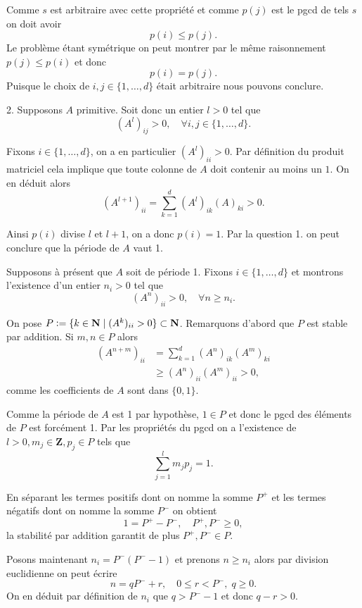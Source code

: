 \documentclass[12pt]{article}
\newcommand{\defeq}{\vcentcolon=}
\newcommand{\Z}{\mathbf{Z}}
\newcommand{\N}{\mathbf{N}}
\begin{document}
Comme $s$ est arbitraire avec cette propriété et comme $p(j)$ est le pgcd de tels $s$ on doit avoir  \[
        p(i) \le p(j)
.\] Le problème étant symétrique on peut montrer par le même raisonnement $p(j) \le p(i)$ et donc \[
p(i) = p(j)
.\] Puisque le choix de $i,j \in \{1,\ldots,d\}$ était arbitraire nous pouvons conclure. 

\bigskip

2. Supposons $A$ primitive. Soit donc un entier $l > 0$ tel que \[
        (A^{l})_{ij} > 0, \quad \forall i,j \in \{1,\ldots,d\} 
.\] 

Fixons $i \in \{1,\ldots,d\}$, on a en particulier $(A^{l})_{ii} > 0$. Par définition du produit matriciel cela implique que toute colonne de $A$ doit contenir au moins un $1$. On en déduit alors
\[
        (A^{l+1})_{ii} = \sum_{k=1}^{d} (A^{l})_{ik} (A)_{ki} > 0
.\] 

Ainsi $p(i)$ divise $l$ et $l+1$, on a donc $p(i) = 1$. Par la question 1. on peut conclure que la période de $A$ vaut 1.

\medskip

Supposons à présent que $A$ soit de période 1. Fixons $i \in \{1,\ldots,d\}$ et montrons l'existence d'un entier $n_{i} > 0$ tel que \[
        (A^{n})_{ii} > 0, \quad \forall n \ge n_{i}
.\]  

On pose $P \defeq \{k \in \N \;|\; (A^{k})_{ii} > 0\} \subset \N$. Remarquons d'abord que $P$ est stable par addition. Si $m,n \in P$ alors
\begin{align*}
        (A^{n+m})_{ii} &= \sum_{k=1}^{d} (A^{n})_{ik}(A^{m})_{ki} \\
                       &\ge (A^{n})_{ii}(A^{m})_{ii} > 0
,\end{align*} comme les coefficients de $A$ sont dans  $\{0,1\}$.


Comme la période de $A$ est 1 par hypothèse, $1 \in P$ et donc le pgcd des éléments de $P$ est forcément 1. Par les propriétés du pgcd on a l'existence de $l > 0, m_{j} \in \Z, p_{j} \in P$ tels que \[
\sum_{j=1}^{l} m_{j}p_{j} = 1
.\] 

En séparant les termes positifs dont on nomme la somme $P^{+}$ et les termes négatifs dont on nomme la somme $P^{-}$ on obtient \[
1 = P^{+} - P^{-}, \quad P^{+}, P^{-} \ge 0
,\] la stabilité par addition garantit de plus $P^{+}, P^{-} \in P$. 

Posons maintenant $n_{i} = P^{-}(P^{-}-1)$ et prenons $n \ge n_{i}$ alors par division euclidienne on peut écrire \[
n = qP^{-} + r, \quad 0 \le r < P^{-}, \; q \ge 0
.\] On en déduit par définition de $n_{i}$ que $q > P^{-} - 1$ et donc $q-r > 0$.
\end{document}
